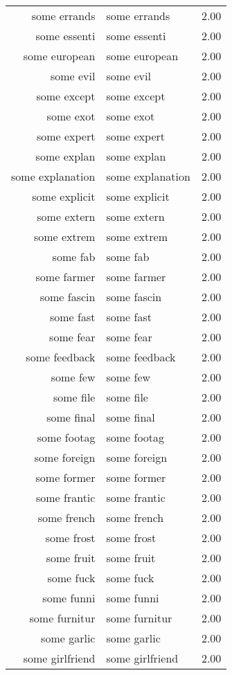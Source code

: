 \begin{table}[ht]
\begin{tabular}{rlr}
  some errands & some errands & 2.00 \\ 
  some essenti & some essenti & 2.00 \\ 
  some european & some european & 2.00 \\ 
  some evil & some evil & 2.00 \\ 
  some except & some except & 2.00 \\ 
  some exot & some exot & 2.00 \\ 
  some expert & some expert & 2.00 \\ 
  some explan & some explan & 2.00 \\ 
  some explanation & some explanation & 2.00 \\ 
  some explicit & some explicit & 2.00 \\ 
  some extern & some extern & 2.00 \\ 
  some extrem & some extrem & 2.00 \\ 
  some fab & some fab & 2.00 \\ 
  some farmer & some farmer & 2.00 \\ 
  some fascin & some fascin & 2.00 \\ 
  some fast & some fast & 2.00 \\ 
  some fear & some fear & 2.00 \\ 
  some feedback & some feedback & 2.00 \\ 
  some few & some few & 2.00 \\ 
  some file & some file & 2.00 \\ 
  some final & some final & 2.00 \\ 
  some footag & some footag & 2.00 \\ 
  some foreign & some foreign & 2.00 \\ 
  some former & some former & 2.00 \\ 
  some frantic & some frantic & 2.00 \\ 
  some french & some french & 2.00 \\ 
  some frost & some frost & 2.00 \\ 
  some fruit & some fruit & 2.00 \\ 
  some fuck & some fuck & 2.00 \\ 
  some funni & some funni & 2.00 \\ 
  some furnitur & some furnitur & 2.00 \\ 
  some garlic & some garlic & 2.00 \\ 
  some girlfriend & some girlfriend & 2.00 \\ 

\end{tabular}
\end{table}

